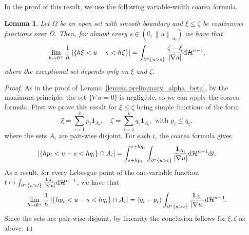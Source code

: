 \documentclass[11pt]{amsart}
\newcommand{\lemmname}{Lemma}
\theoremstyle{plain}
\newtheorem{lemma}[theorem]{\lemmname}
\theoremstyle{definition}
\def\dd{{\rm d}}
\newcommand{\norm}[1]{\left\lVert#1\right\rVert}
\begin{document}
In the proof of this result, we use the following variable-width coarea formula.
\begin{lemma}\label{lemma.variable_width_coarea}
Let $\Omega$ be an open set with smooth boundary and $\xi \le \zeta$ be continuous functions over $\overline{\Omega}$. Then, for almost every $s \in (0, \norm{u}_\infty)$ we have that 
\[
    \lim_{h \to 0^+} 
    \frac{1}{h}
    \left|
        \left\{
            h \xi < u - s < h \zeta
        \right\}
    \right|
    = 
    \int_{\partial^*\{u > s\}} 
    \frac{\zeta - \xi}{|\nabla u|} \dd \mathcal{H}^{n-1},
\]
where the exceptional set depends only on $\xi$ and $\zeta$.
\end{lemma}
\begin{proof}
    As in the proof of Lemma~\ref{lemma.preliminary_alpha_beta}, by the maximum principle, the set $\{\nabla u = 0\}$ is negligible, so we can apply the coarea formula. First we prove this result for $\xi \le \zeta$ being simple functions of the form 
    \[
        \xi = \sum_{i = 1}^k p_i \mathbf{1}_{A_i}, \quad 
        \zeta = \sum_{i = 1}^k q_i \mathbf{1}_{A_i}, 
        \text{ with } 
        p_i \le q_i, 
    \]
    where the sets $A_i$ are pair-wise disjoint. For each $i$, the coarea formula gives 
    \[
        \left|
        \left\{
            h p_i < u - s < h q_i
        \right\} \cap A_i
        \right|
        = 
        \int_{s + h p_i}^{s + h q_i}
        \int_{\partial^*\{u > t\}} 
        \frac{\mathbf{1}_{A_i}}{|\nabla u|} 
        \dd\mathcal{H}^{n-1}\dd t.
    \]
    As a result, for every Lebesgue point of the one-variable function $t \mapsto \int_{\partial^*\{u > t\}} \frac{\mathbf{1}_{A_i}}{|\nabla u|} \dd\mathcal{H}^{n-1}$, we have that 
    \[
        \lim_{h \to 0^+} 
        \frac{1}{h}
        \left|
        \left\{
            h p_i < u - s < h q_i
        \right\} \cap A_i
        \right|
        = 
        (q_i - p_i)
        \int_{\partial^*\{u > s\}} 
        \frac{\mathbf{1}_{A_i}}{|\nabla u|} 
        \dd\mathcal{H}^{n-1}.
    \]
    Since the sets are pair-wise disjoint, by linearity the conclusion follows for $\xi, \zeta$ as above. 


\end{proof}
\end{document}
